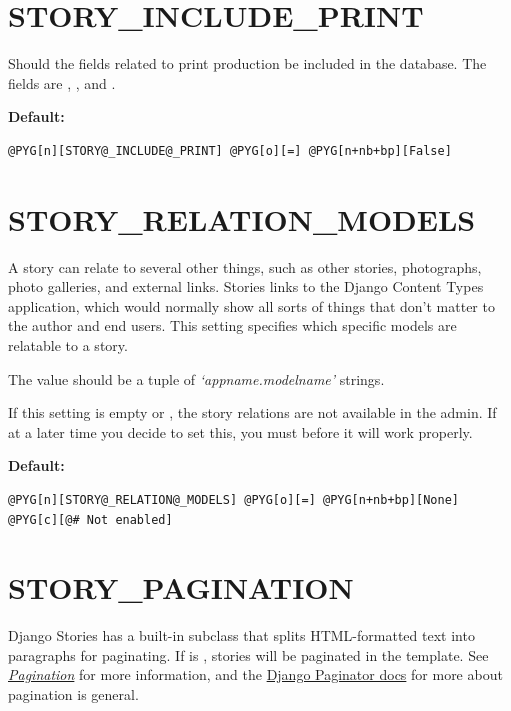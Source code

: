 \documentclass[letterpaper,10pt,english]{manual}
\begin{document}
\section{STORY\_INCLUDE\_PRINT}

Should the fields related to print production be included in the database. The fields are , , and .

\textbf{Default:}

\begin{Verbatim}[commandchars=@\[\]]
@PYG[n][STORY@_INCLUDE@_PRINT] @PYG[o][=] @PYG[n+nb+bp][False]
\end{Verbatim}
\hypertarget{story-relation-models}{}

\section{STORY\_RELATION\_MODELS}

A story can relate to several other things, such as other stories, photographs, photo galleries, and external links. Stories links to the Django Content Types application, which would normally show all sorts of things that don't matter to the author and end users. This setting specifies which specific models are relatable to a story.

The value should be a tuple of \emph{`appname.modelname'} strings.

If this setting is empty or , the story relations are not available in the admin. If at a later time you decide to set this, you must  before it will work properly.

\textbf{Default:}

\begin{Verbatim}[commandchars=@\[\]]
@PYG[n][STORY@_RELATION@_MODELS] @PYG[o][=] @PYG[n+nb+bp][None] @PYG[c][@# Not enabled]
\end{Verbatim}
\hypertarget{story-pagination}{}

\section{STORY\_PAGINATION}

Django Stories has a built-in  subclass that splits HTML-formatted text into paragraphs for paginating. If  is , stories will be paginated in the template. See \hyperlink{pagination}{\emph{Pagination}} for more information, and the
\href{http://docs.djangoproject.com/en/dev/topics/pagination/\#paginator-objects}{Django Paginator docs} for more about pagination is general.
\end{document}
